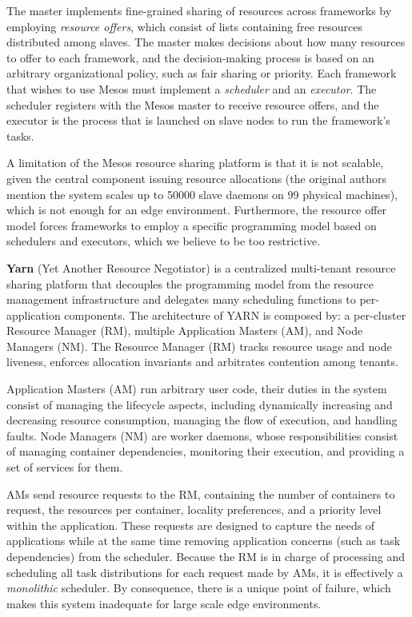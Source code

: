 The master implements fine-grained sharing of resources across frameworks by employing \textit{resource offers}, which consist of lists containing free resources distributed among slaves. The master makes decisions about how many resources to offer to each framework, and the decision-making process is based on an arbitrary organizational policy, such as fair sharing or priority. Each framework that wishes to use Mesos must implement a \textit{scheduler} and an \textit{executor}. The scheduler registers with the Mesos master to receive resource offers, and the executor is the process that is launched on slave nodes to run the framework's tasks.

A limitation of the Mesos resource sharing platform is that it is not scalable, given the central component issuing resource allocations (the original authors mention the system scales up to 50000 slave daemons on 99 physical machines), which is not enough for an edge environment. Furthermore, the resource offer model forces frameworks to employ a specific programming model based on schedulers and executors, which we believe to be too restrictive.

\textbf{Yarn} (Yet Another Resource Negotiator) \cite{Vavilapalli2013ApacheHY} is a centralized multi-tenant resource sharing platform that decouples the programming model from the resource management infrastructure and delegates many scheduling functions to per-application components. The architecture of YARN is composed by: a per-cluster Resource Manager (RM), multiple Application Masters (AM), and Node Managers (NM). The Resource Manager (RM) tracks resource usage and node liveness, enforces allocation invariants and arbitrates contention among tenants.

Application Masters (AM) run arbitrary user code, their duties in the system consist of managing the lifecycle aspects, including dynamically increasing and decreasing resource consumption, managing the flow of execution, and handling faults. Node Managers (NM) are worker daemons, whose responsibilities consist of managing container dependencies, monitoring their execution, and providing a set of services for them.

AMs send resource requests to the RM, containing the number of containers to request, the resources per container, locality preferences, and a priority level within the application. These requests are designed to capture the needs of applications while at the same time removing application concerns (such as task dependencies) from the scheduler. Because the RM is in charge of processing and scheduling all task distributions for each request made by AMs, it is effectively a \textit{monolithic} scheduler. By consequence, there is a unique point of failure, which makes this system inadequate for large scale edge environments.


